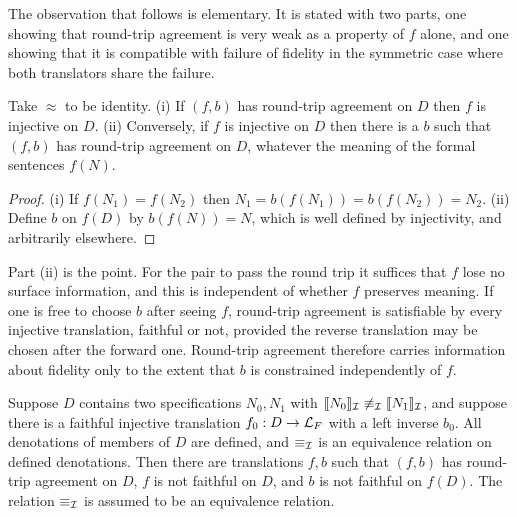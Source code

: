 The observation that follows is elementary. It is stated with two parts, one showing that round-trip agreement is very weak as a property of $f$ alone, and one showing that it is compatible with failure of fidelity in the symmetric case where both translators share the failure.

\begin{proposition}
\label{prop:injective}
Take $\approx$ to be identity. (i) If $(f,b)$ has round-trip agreement on $D$ then $f$ is injective on $D$. (ii) Conversely, if $f$ is injective on $D$ then there is a $b$ such that $(f,b)$ has round-trip agreement on $D$, whatever the meaning of the formal sentences $f(N)$.
\end{proposition}

\begin{proof}
(i) If $f(N_1)=f(N_2)$ then $N_1 = b(f(N_1)) = b(f(N_2)) = N_2$. (ii) Define $b$ on $f(D)$ by $b(f(N)) = N$, which is well defined by injectivity, and arbitrarily elsewhere.
\end{proof}

Part (ii) is the point. For the pair to pass the round trip it suffices that $f$ lose no surface information, and this is independent of whether $f$ preserves meaning. If one is free to choose $b$ after seeing $f$, round-trip agreement is satisfiable by every injective translation, faithful or not, provided the reverse translation may be chosen after the forward one. Round-trip agreement therefore carries information about fidelity only to the extent that $b$ is constrained independently of $f$.

\begin{theorem}
\label{thm:rv007}
Suppose $D$ contains two specifications $N_0,N_1$ with $\llbracket N_0\rrbracket_{\mathcal{I}}\not\equiv_{\mathcal{I}}\llbracket N_1\rrbracket_{\mathcal{I}}$, and suppose there is a faithful injective translation $f_0 : D\to\mathcal{L}_F$ with a left inverse $b_0$. All denotations of members of $D$ are defined, and $\equiv_{\mathcal{I}}$ is an equivalence relation on defined denotations. Then there are translations $f, b$ such that $(f,b)$ has round-trip agreement on $D$, $f$ is not faithful on $D$, and $b$ is not faithful on $f(D)$. The relation $\equiv_{\mathcal{I}}$ is assumed to be an equivalence relation.
\end{theorem}

